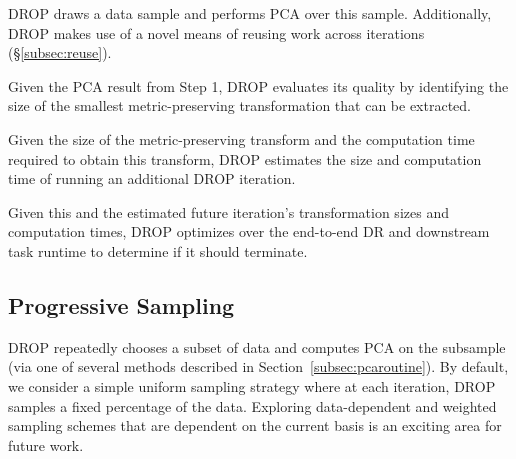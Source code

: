 \noindent DROP draws a data sample and performs PCA over this sample. Additionally, DROP makes use of a novel means of reusing work across iterations (\S\ref{subsec:reuse}).


\noindent Given the PCA result from Step 1, DROP evaluates its quality by identifying the size of the smallest metric-preserving transformation that can be extracted. 


\noindent Given the size of the metric-preserving transform and the computation time required to obtain this transform, DROP estimates the size and computation time of running an additional DROP iteration.


\noindent Given this and the estimated future iteration's transformation sizes and computation times, DROP optimizes over the end-to-end DR and downstream task runtime to determine if it should terminate.

\subsection{Progressive Sampling}
\label{subsec:psample}
DROP repeatedly chooses a subset of data and computes PCA on the subsample (via one of several methods described in Section~\ref{subsec:pcaroutine}).
By default, we consider a simple uniform sampling strategy where at each iteration, DROP samples a fixed percentage of the data.
Exploring data-dependent and weighted sampling schemes that are dependent on the current basis is an exciting area for future work. 


